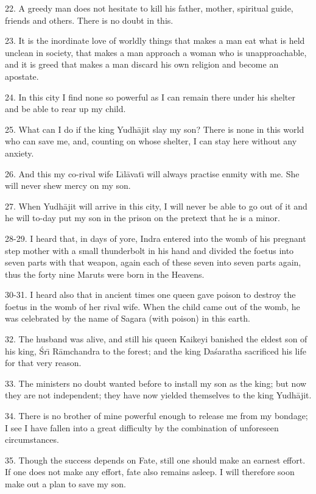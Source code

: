 22. A greedy man does not hesitate to kill his father, mother, spiritual guide, friends and others. There is no doubt in this.

23. It is the inordinate love of worldly things that makes a man eat what is held unclean in society, that makes a man approach a woman who is unapproachable, and it is greed that makes a man discard his own religion and become an apostate.

24. In this city I find none so powerful as I can remain there under his shelter and be able to rear up my child.

25. What can I do if the king Yudh\=ajit slay my son? There is none in this world who can save me, and, counting on whose shelter, I can stay here without any anxiety.

26. And this my co-rival wife L\={\i}l\=avat\={\i} will always practise enmity with me. She will never shew mercy on my son.

27. When Yudh\=ajit will arrive in this city, I will never be able to go out of it and he will to-day put my son in the prison on the pretext that he is a minor.

28-29. I heard that, in days of yore, Indra entered into the womb of his pregnant step mother with a small thunderbolt in his hand and divided the foetus into seven parts with that weapon, again each of these seven into seven parts again, thus the forty nine Maruts were born in the Heavens.

30-31. I heard also that in ancient times one queen gave poison to destroy the foetus in the womb of her rival wife. When the child came out of the womb, he was celebrated by the name of Sagara (with poison) in this earth.

32. The husband was alive, and still his queen Kaikeyi banished the eldest son of his king, \'Sr\={\i} R\=amchandra to the forest; and the king Da\'saratha sacrificed his life for that very reason.

33. The ministers no doubt wanted before to install my son as the king; but now they are not independent; they have now yielded themselves to the king Yudh\=ajit.

34. There is no brother of mine powerful enough to release me from my bondage; I see I have fallen into a great difficulty by the combination of unforeseen circumstances.

35. Though the success depends on Fate, still one should make an earnest effort. If one does not make any effort, fate also remains asleep. I will therefore soon make out a plan to save my son.

